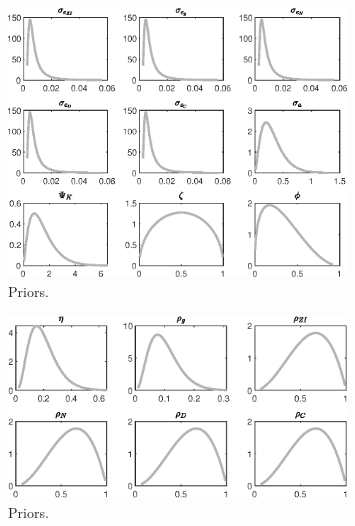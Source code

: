  
\begin{figure}[H]
\centering
\includegraphics[width=0.80\textwidth]{BRS_growth_ext_util/graphs/BRS_growth_ext_util_Priors1}
\caption{Priors.}\label{Fig:Priors:1}
\end{figure}
\begin{figure}[H]
\centering
\includegraphics[width=0.80\textwidth]{BRS_growth_ext_util/graphs/BRS_growth_ext_util_Priors2}
\caption{Priors.}\label{Fig:Priors:2}
\end{figure}
 
